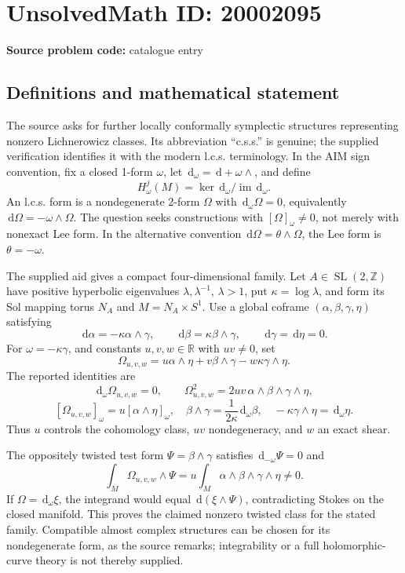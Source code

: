 \documentclass[11pt]{article}
\newcommand{\Z}{\mathbb{Z}}
\newcommand{\R}{\mathbb{R}}
\newcommand{\dd}{\,\mathrm{d}}
\begin{document}
\section*{UnsolvedMath ID: 20002095}
\textbf{Source problem code:} catalogue entry
\subsection{Definitions and mathematical statement}
The source asks for further locally conformally symplectic structures representing nonzero Lichnerowicz classes. Its abbreviation ``c.s.s.'' is genuine; the supplied verification identifies it with the modern l.c.s. terminology. In the AIM sign convention, fix a closed 1-form \(\omega\), let \(\dd_\omega=\dd+\omega\wedge\), and define
\[
H_\omega^j(M)=\ker\dd_\omega/\operatorname{im}\dd_\omega.
\]
An l.c.s. form is a nondegenerate 2-form \(\Omega\) with \(\dd_\omega\Omega=0\), equivalently \(\dd\Omega=-\omega\wedge\Omega\). The question seeks constructions with \([\Omega]_\omega\ne0\), not merely with nonexact Lee form. In the alternative convention \(\dd\Omega=\theta\wedge\Omega\), the Lee form is \(\theta=-\omega\).

The supplied aid gives a compact four-dimensional family. Let \(A\in\operatorname{SL}(2,\Z)\) have positive hyperbolic eigenvalues \(\lambda,\lambda^{-1}\), \(\lambda>1\), put \(\kappa=\log\lambda\), and form its Sol mapping torus \(N_A\) and \(M=N_A\times S^1\). Use a global coframe \((\alpha,\beta,\gamma,\eta)\) satisfying
\[
\dd\alpha=-\kappa\alpha\wedge\gamma,\qquad
\dd\beta=\kappa\beta\wedge\gamma,\qquad
\dd\gamma=\dd\eta=0.
\]
For \(\omega=-\kappa\gamma\), and constants \(u,v,w\in\R\) with \(uv\ne0\), set
\[
\Omega_{u,v,w}=u\alpha\wedge\eta+v\beta\wedge\gamma-w\kappa\gamma\wedge\eta.
\]
The reported identities are
\[
\dd_\omega\Omega_{u,v,w}=0,\qquad
\Omega_{u,v,w}^2=2uv\,\alpha\wedge\beta\wedge\gamma\wedge\eta,
\]
\[
[\Omega_{u,v,w}]_\omega=u[\alpha\wedge\eta]_\omega,
\quad
\beta\wedge\gamma=\frac1{2\kappa}\dd_\omega\beta,
\quad-\kappa\gamma\wedge\eta=\dd_\omega\eta.
\]
Thus \(u\) controls the cohomology class, \(uv\) nondegeneracy, and \(w\) an exact shear.

The oppositely twisted test form \(\Psi=\beta\wedge\gamma\) satisfies \(\dd_{-\omega}\Psi=0\) and
\[
\int_M\Omega_{u,v,w}\wedge\Psi
=u\int_M\alpha\wedge\beta\wedge\gamma\wedge\eta\ne0.
\]
If \(\Omega=\dd_\omega\xi\), the integrand would equal \(\dd(\xi\wedge\Psi)\), contradicting Stokes on the closed manifold. This proves the claimed nonzero twisted class for the stated family. Compatible almost complex structures can be chosen for its nondegenerate form, as the source remarks; integrability or a full holomorphic-curve theory is not thereby supplied.
\end{document}

